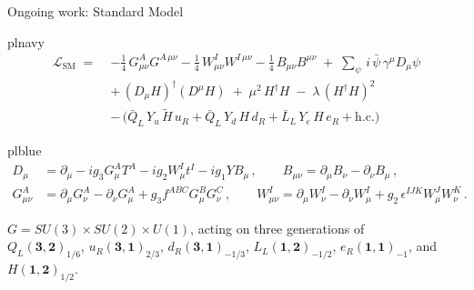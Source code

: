 \documentclass[aspectratio=169,10pt]{beamer}
\begin{document}
\begin{frame}{Ongoing work: Standard Model}
  \vfill
  \begin{plplain}[top=3pt,bottom=3pt]{plnavy}
    \vspace{1pt}
    \begin{align*}
      \mathcal{L}_{\text{SM}} \;=\;
        & -\tfrac{1}{4}\,G^{A}_{\mu\nu}G^{A\,\mu\nu}
          -\tfrac{1}{4}\,W^{I}_{\mu\nu}W^{I\,\mu\nu}
          -\tfrac{1}{4}\,B_{\mu\nu}B^{\mu\nu}
          \;+\;\sum_{\psi}\, i\,\bar{\psi}\,\gamma^{\mu}D_{\mu}\psi\\
        & +\,(D_{\mu}H)^{\dagger}(D^{\mu}H)
          \;+\;\mu^{2}\,H^{\dagger}H\;-\;\lambda\,(H^{\dagger}H)^{2}\\
        & -\,\Big(\bar{Q}_{L}\,Y_{u}\,\tilde{H}\,u_{R}
                 +\bar{Q}_{L}\,Y_{d}\,H\,d_{R}
                 +\bar{L}_{L}\,Y_{e}\,H\,e_{R}
                 +\text{h.c.}\Big)
    \end{align*}
    \vspace{-9pt}
  \end{plplain}

  \begin{plplain}[top=3pt,bottom=3pt,before skip=2pt]{plblue}
    {\scriptsize
    \vspace{-3pt}
    \begin{align*}
      D_{\mu} &= \partial_{\mu} - i g_{3} G^{A}_{\mu}T^{A}
                 - i g_{2} W^{I}_{\mu}t^{I} - i g_{1} Y B_{\mu}\,,
      \qquad
      B_{\mu\nu} = \partial_{\mu}B_{\nu}-\partial_{\nu}B_{\mu}\,,\\
      G^{A}_{\mu\nu} &= \partial_{\mu}G^{A}_{\nu}-\partial_{\nu}G^{A}_{\mu}
                 + g_{3} f^{ABC} G^{B}_{\mu}G^{C}_{\nu}\,,
      \qquad
      W^{I}_{\mu\nu} = \partial_{\mu}W^{I}_{\nu}-\partial_{\nu}W^{I}_{\mu}
                 + g_{2}\,\epsilon^{IJK} W^{J}_{\mu}W^{K}_{\nu}\,.
    \end{align*}
    \vspace{-12pt}}
    \begin{center}\scriptsize
      $G=SU(3)\times SU(2)\times U(1)$, acting on three generations of\\
      $Q_{L}(\mathbf{3},\mathbf{2})_{1/6}$,
      $u_{R}(\mathbf{3},\mathbf{1})_{2/3}$,
      $d_{R}(\mathbf{3},\mathbf{1})_{-1/3}$,
      $L_{L}(\mathbf{1},\mathbf{2})_{-1/2}$,
      $e_{R}(\mathbf{1},\mathbf{1})_{-1}$, and $H(\mathbf{1},\mathbf{2})_{1/2}$.
    \end{center}
  \end{plplain}
  \vfill
\end{frame}
\end{document}
